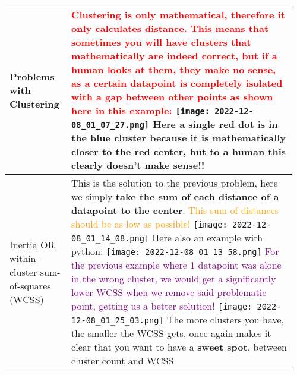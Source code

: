 \documentclass[main.tex,fontsize=8pt,paper=a4,paper=portrait,DIV=calc,]{scrartcl}
\begin{document}
\pagebreak 
\begin{table}[ht!]
\begin{tabular}{|m{0.2\linewidth}|m{0.755\linewidth}|}
\hline
Problems with Clustering & 
\textcolor{red}{Clustering is only mathematical, therefore it only calculates distance. This means that sometimes you will have clusters that mathematically are indeed correct, but if a human looks at them, they make no sense, as a certain datapoint is completely isolated with a gap between other points as shown here in this example:}\newline
\texttt{[image: 2022-12-08\_01\_07\_27.png]}\newline
Here a single red dot is in the blue cluster because it is mathematically closer to the red center, but to a human this clearly doesn't make sense!!
\\
\hline
Inertia OR within-cluster sum-of-squares (WCSS) & 
This is the solution to the previous problem, here we simply \textbf{take the sum of each distance of a datapoint to the center}.\newline
\textcolor{orange}{This sum of distances should be as low as possible!}\newline
\texttt{[image: 2022-12-08\_01\_14\_08.png]}\newline
Here also an example with python:\newline
\texttt{[image: 2022-12-08\_01\_13\_58.png]}\newline
\textcolor{purple}{For the previous example where 1 datapoint was alone in the wrong cluster, we would get a significantly lower WCSS when we remove said problematic point, getting us a better solution!}\newline
\texttt{[image: 2022-12-08\_01\_25\_03.png]}\newline
The more clusters you have, the smaller the WCSS gets, once again makes it clear that you want to have a \textbf{sweet spot}, between cluster count and WCSS 
\\
\hline
\end{tabular}
\end{table}
\pagebreak
\end{document}

